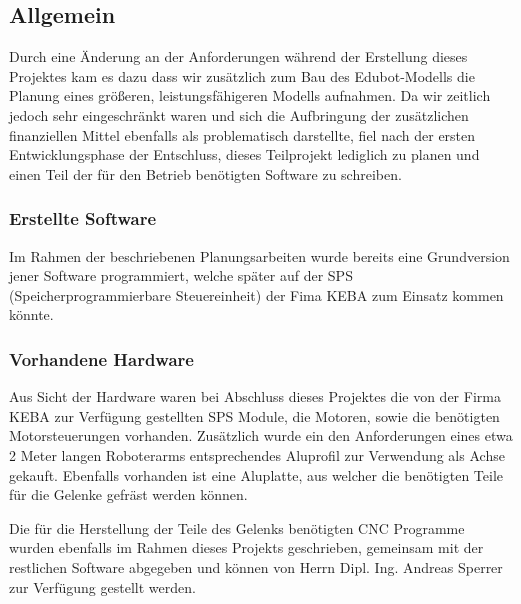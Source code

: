 \subsection{Allgemein}
Durch eine Änderung an der Anforderungen während der Erstellung dieses Projektes kam es dazu dass wir zusätzlich zum Bau des Edubot-Modells die Planung eines größeren, leistungsfähigeren Modells aufnahmen. Da wir zeitlich jedoch sehr eingeschränkt waren und sich die Aufbringung der zusätzlichen finanziellen Mittel ebenfalls als problematisch darstellte, fiel nach der ersten Entwicklungsphase der Entschluss, dieses Teilprojekt lediglich zu planen und einen Teil der für den Betrieb benötigten Software zu schreiben.

\subsubsection{Erstellte Software}
Im Rahmen der beschriebenen Planungsarbeiten wurde bereits eine Grundversion jener Software programmiert, welche später auf der SPS (Speicherprogrammierbare Steuereinheit) der Fima KEBA zum Einsatz kommen könnte.

\subsubsection{Vorhandene Hardware}
Aus Sicht der Hardware waren bei Abschluss dieses Projektes die von der Firma KEBA zur Verfügung gestellten SPS Module, die Motoren, sowie die benötigten Motorsteuerungen vorhanden. Zusätzlich wurde ein den Anforderungen eines etwa 2 Meter langen Roboterarms entsprechendes Aluprofil zur Verwendung als Achse gekauft. Ebenfalls vorhanden ist eine Aluplatte, aus welcher die benötigten Teile für die Gelenke gefräst werden können.

Die für die Herstellung der Teile des Gelenks benötigten CNC Programme wurden ebenfalls im Rahmen dieses Projekts geschrieben, gemeinsam mit der restlichen Software abgegeben und können von Herrn Dipl. Ing. Andreas Sperrer zur Verfügung gestellt werden.